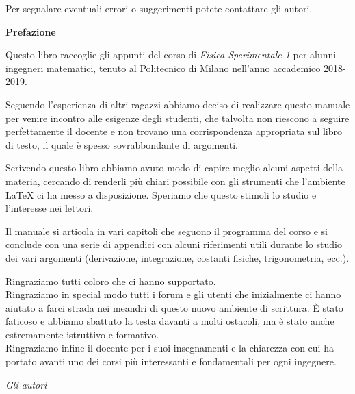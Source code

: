 \documentclass[10pt,a4paper]{book}
\newcommand{\latex}{\LaTeX\xspace}
\begin{document}
Per segnalare eventuali errori o suggerimenti potete contattare gli autori.

\newpage





{\Huge \textbf{Prefazione}}

Questo libro raccoglie gli appunti del corso di \emph{Fisica Sperimentale 1} per alunni ingegneri matematici, tenuto al Politecnico di Milano nell'anno accademico 2018-2019.%

Seguendo l'esperienza di altri ragazzi abbiamo deciso di realizzare questo manuale per venire incontro alle esigenze degli studenti, che talvolta non riescono a seguire perfettamente il docente e non trovano una corrispondenza appropriata sul libro di testo, il quale è spesso sovrabbondante di argomenti.

Scrivendo questo libro abbiamo avuto modo di capire meglio alcuni aspetti della materia, cercando di renderli più chiari possibile con gli strumenti che l'ambiente \latex ci ha messo a disposizione. Speriamo che questo stimoli lo studio e l'interesse nei lettori.

Il manuale si articola in vari capitoli che seguono il programma del corso e si conclude con una serie di appendici con alcuni riferimenti utili durante lo studio dei vari argomenti (derivazione, integrazione, costanti fisiche, trigonometria, ecc.).

Ringraziamo tutti coloro che ci hanno supportato.\\
Ringraziamo in special modo tutti i forum e gli utenti che inizialmente ci hanno aiutato a farci strada nei meandri di questo nuovo ambiente di scrittura. È stato faticoso e abbiamo sbattuto la testa davanti a molti ostacoli, ma è stato anche estremamente istruttivo e formativo.\\
Ringraziamo infine il docente per i suoi insegnamenti e la chiarezza con cui ha portato avanti uno dei corsi più interessanti e fondamentali per ogni ingegnere.

\begin{flushright}
\emph{Gli autori} \hspace*{2cm}
\end{flushright}

\newpage


\end{document}
